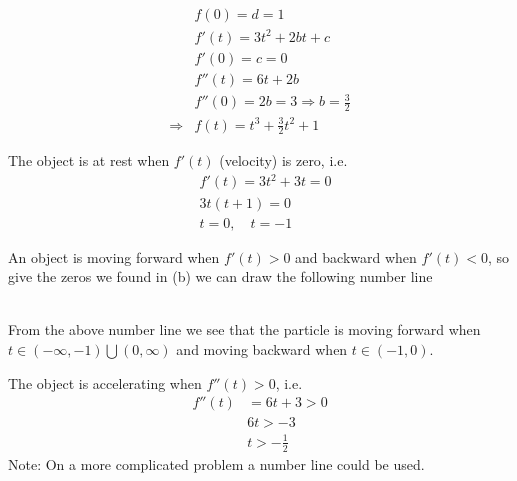 \documentclass{hwset}
\begin{document}
\be
	\item
	\begin{solution}
		\begin{align*}
			&f(0) = d = 1 \\
			&f'(t) = 3t^2 + 2bt + c \\
			&f'(0) = c = 0 \\
			&f''(t) = 6t+2b \\
			&f''(0) = 2b = 3 \Rightarrow b = \frac{3}{2} \\
			\Rightarrow & \boxed{f(t) = t^3 + \frac{3}{2} t^2 + 1} 
		\end{align*}
	\end{solution}
	\item
	\begin{solution}
	The object is at rest when $f'(t)$ (velocity) is zero, i.e.
	\begin{align*}
		&f'(t) = 3t^2 + 3t = 0 \\
		&3t(t + 1) = 0\\
		&\boxed{t = 0, \quad t = -1}
	\end{align*}
	\end{solution}
	\item
	\begin{solution}
		An object is moving forward when $f'(t)>0$ and backward when $f'(t)<0$, so
		give the zeros we found in (b) we can draw the following number line \\
 \\
		From the above number line we see that the particle is moving forward when
		$\boxed{t\in(-\infty,-1)\bigcup(0,\infty)}$ and moving backward when
		$\boxed{t\in(-1,0)}$.
	\end{solution}
	\item
	\begin{solution}
		The object is accelerating when $f''(t)>0$, i.e.
		\begin{align*}
			f''(t) &= 6t+3 > 0 \\
			&6t > -3 \\
			&\boxed{t > -\frac{1}{2}}
		\end{align*}
		Note: On a more complicated problem a number line could be used.
	\end{solution}
\end{document}
